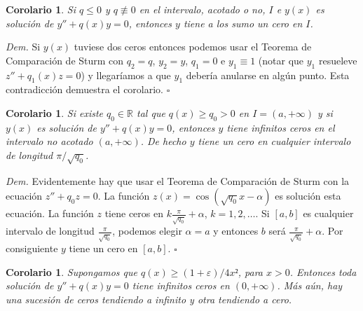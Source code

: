 \documentclass{article}
\newenvironment{demo}{\noindent\emph{Dem.}}{{\hspace*{\fill}$\square$} \newline\vspace{5pt}}
\renewcommand{\epsilon}{\varepsilon}
\newtheorem{corolario}[teorema]{Corolario}
\begin{document}
\begin{corolario} Si $q\leq 0$ y $q\not\equiv 0$ en el intervalo, acotado o no, $I$ e  $y(x)$ es solución de $y''+q(x)y=0$, entonces $y$ tiene a los sumo un cero en $I$.
\end{corolario}
\begin{demo} Si $y(x)$ tuviese dos ceros entonces podemos usar el Teorema de Comparación de Sturm con $q_2=q$, $y_2=y$, $q_1=0$ e $y_1\equiv 1$ (notar que $y_1$ resueleve $z''+q_1(x)z=0$) y llegaríamos a que $y_1$ debería anularse en algún punto. Esta contradicción demuestra el corolario.  
\end{demo}



\begin{corolario} Si existe $q_0\in\mathbb{R}$ tal que  $q(x)\geq q_0>0$ en $I=(a,+\infty)$ y si  $y(x)$ es solución de $y''+q(x)y=0$, entonces $y$ tiene infinitos ceros en el intervalo no acotado $(a,+\infty)$. De hecho $y$ tiene un cero en cualquier intervalo de longitud $\pi/\sqrt{q_0}$.
\end{corolario}
\begin{demo}  Evidentemente hay que usar el Teorema de Comparación de Sturm con la ecuación $z''+q_0z=0$. La función  $z(x)=\cos(\sqrt{q_0}x-\alpha)$ es solución  esta ecuación. La función $z$ tiene ceros en  $k\frac{\pi}{\sqrt{q_0}}+\alpha$, $k=1,2,\ldots$. Si $[a,b]$ es cualquier intervalo de longitud $ \frac{\pi}{\sqrt{q_0}}$, podemos elegir $\alpha=a$ y entonces $b$ será $\frac{\pi}{\sqrt{q_0}}+\alpha$. Por consiguiente $y$ tiene un cero en $[a,b]$.
\end{demo}



\begin{corolario} Supongamos que $q(x)\geq (1+\epsilon)/4x²$, para $x>0$. Entonces toda solución de $y''+q(x)y=0$ tiene infinitos ceros en $(0,+\infty)$. Más aún, hay una sucesión de ceros tendiendo a infinito y otra tendiendo a cero.
\end{corolario}
\end{document}
